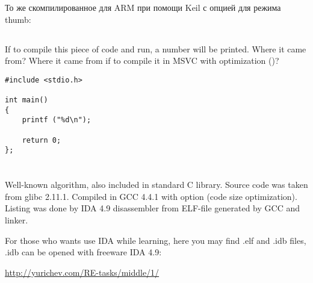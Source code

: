 

То же скомпилированное для ARM при помощи Keil с опцией \Othree для режима thumb:



\subsection{}

{If to compile this piece of code and run, a number will be printed. Where it came from?
Where it came from if to compile it in MSVC with optimization (\Ox)?}

\begin{lstlisting}
#include <stdio.h>

int main()
{
	printf ("%d\n");

	return 0;
};
\end{lstlisting}

\section{}

\subsection{}

{Well-known algorithm, also included in standard C library. Source code was taken from glibc 2.11.1.
Compiled in GCC 4.4.1 with  option (code size optimization).
Listing was done by IDA 4.9 disassembler from ELF-file generated by GCC and linker.}

{For those who wants use IDA while learning, here you may find .elf and .idb files,
.idb can be opened with freeware IDA 4.9:}

\url{http://yurichev.com/RE-tasks/middle/1/}



